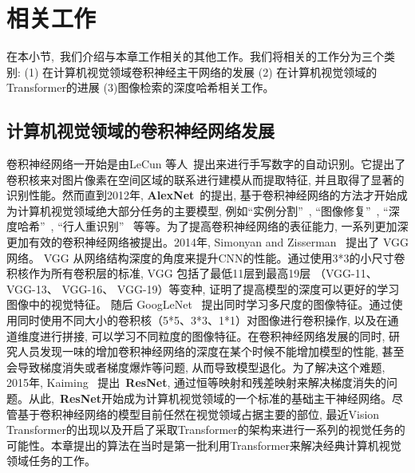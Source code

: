 \section{相关工作}
在本小节,~我们介绍与本章工作相关的其他工作。我们将相关的工作分为三个类别: (1) 在计算机视觉领域卷积神经主干网络的发展 (2) 在计算机视觉领域的Transformer的进展 (3)图像检索的深度哈希相关工作。
\subsection{计算机视觉领域的卷积神经网络发展}
卷积神经网络一开始是由LeCun 等人~\cite{cnnoriginal}提出来进行手写数字的自动识别。它提出了卷积核来对图片像素在空间区域的联系进行建模从而提取特征, 并且取得了显著的识别性能。然而直到2012年, \textbf{AlexNet}~\cite{alexnet}的提出, 基于卷积神经网络的方法才开始成为计算机视觉领域绝大部分任务的主要模型, 例如``实例分割''~\cite{he2016deep, ren2017end}, ``图像修复''~\cite{yeh2017semantic,yu2019free}, ``深度哈希''~\cite{cao2018deep, cao2017hashnet}, ``行人重识别''~\cite{chen2020maenet, hermans2017defense, ye2018hierarchical, ye2018visible} 等等。为了提高卷积神经网络的表征能力, 一系列更加深更加有效的卷积神经网络被提出。2014年, Simonyan and Zisserman~\cite{simonyan2014very} 提出了 VGG 网络。 VGG 从网络结构深度的角度来提升CNN的性能。通过使用3*3的小尺寸卷积核作为所有卷积层的标准, VGG 包括了最低11层到最高19层 （VGG-11、 VGG-13、 VGG-16、 VGG-19）等变种, 证明了提高模型的深度可以更好的学习图像中的视觉特征。 随后 GoogLeNet~\cite{szegedy2015going} 提出同时学习多尺度的图像特征。通过使用同时使用不同大小的卷积核（5*5、3*3、1*1）对图像进行卷积操作, 以及在通道维度进行拼接, 可以学习不同粒度的图像特征。在卷积神经网络发展的同时, 研究人员发现一味的增加卷积神经网络的深度在某个时候不能增加模型的性能, 甚至会导致梯度消失或者梯度爆炸等问题, 从而导致模型退化。为了解决这个难题, 2015年, Kaiming~\cite{he2016deep} 提出~\textbf{ResNet}, 通过恒等映射和残差映射来解决梯度消失的问题。从此,~\textbf{ResNet}开始成为计算机视觉领域的一个标准的基础主干神经网络。尽管基于卷积神经网络的模型目前任然在视觉领域占据主要的部位, 最近Vision Transformer的出现以及开启了采取Transformer的架构来进行一系列的视觉任务的可能性。本章提出的算法在当时是第一批利用Transformer来解决经典计算机视觉领域任务的工作。\par
